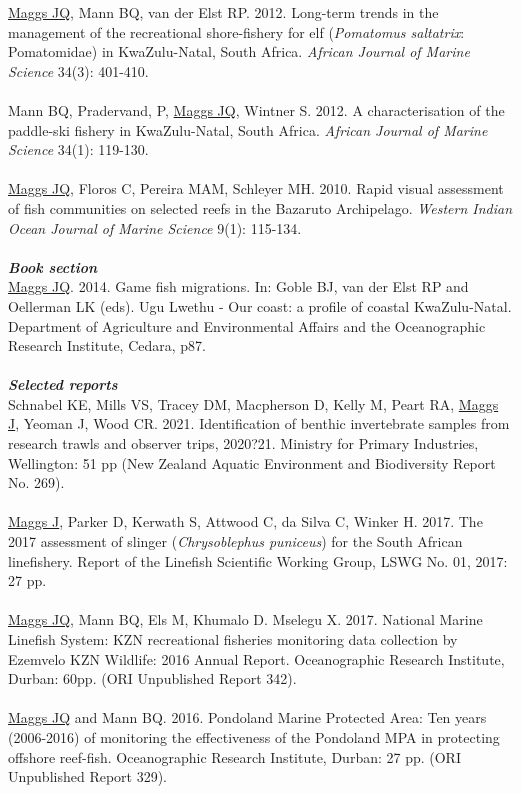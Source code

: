 \documentclass[10pt,a4paper]{article}
\begin{document}
\underline{Maggs JQ}, Mann BQ, van der Elst RP. 2012. Long-term trends in the management of the recreational shore-fishery for elf (\textit{Pomatomus saltatrix}: Pomatomidae) in KwaZulu-Natal, South Africa. \textit{African Journal of Marine Science} 34(3): 401-410.\\
\\
Mann BQ, Pradervand, P, \underline{Maggs JQ}, Wintner S. 2012. A characterisation of the paddle-ski fishery in KwaZulu-Natal, South Africa. \textit{African Journal of Marine Science} 34(1): 119-130.\\
\\
\underline{Maggs JQ}, Floros C, Pereira MAM, Schleyer MH. 2010. Rapid visual assessment of fish communities on selected reefs in the Bazaruto Archipelago. \textit{Western Indian Ocean Journal of Marine Science} 9(1): 115-134.\\	
\\
\textit{\textbf{Book section}}\\
\underline{Maggs JQ}. 2014. Game fish migrations. In: Goble BJ, van der Elst RP and Oellerman LK (eds). Ugu Lwethu - Our coast: a profile of coastal KwaZulu-Natal. Department of Agriculture and Environmental Affairs and the Oceanographic Research Institute, Cedara, p87.\\
\\
\textit{\textbf{Selected reports}}\\
Schnabel KE, Mills VS, Tracey DM, Macpherson D, Kelly M, Peart RA, \underline{Maggs J}, Yeoman J, Wood CR. 2021. Identification of benthic invertebrate samples from research trawls and observer trips, 2020?21. Ministry for Primary Industries, Wellington: 51 pp (New Zealand Aquatic Environment and Biodiversity Report No. 269).\\
\\
\underline{Maggs J}, Parker D, Kerwath S, Attwood C, da Silva C, Winker H. 2017. The 2017 assessment of slinger (\textit{Chrysoblephus puniceus}) for the South African linefishery. Report of the Linefish Scientific Working Group, LSWG No. 01, 2017: 27 pp.\\
\\
\underline{Maggs JQ}, Mann BQ, Els M, Khumalo D. Mselegu X. 2017. National Marine Linefish System: KZN recreational fisheries monitoring data collection by Ezemvelo KZN Wildlife: 2016 Annual Report. Oceanographic Research Institute, Durban: 60pp. (ORI Unpublished Report 342).\\
\\
\underline{Maggs JQ} and Mann BQ. 2016. Pondoland Marine Protected Area: Ten years (2006-2016) of monitoring the effectiveness of the Pondoland MPA in protecting offshore reef-fish. Oceanographic Research Institute, Durban: 27 pp. (ORI Unpublished Report 329).\\
\end{document}
